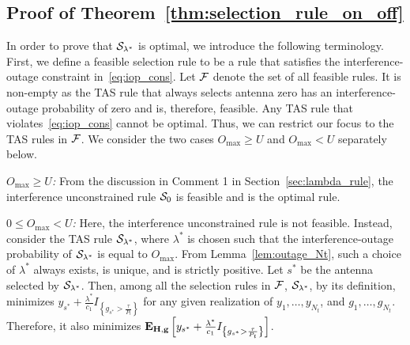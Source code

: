 \documentclass[12pt,draftcls,peerreview,onecolumn]{IEEEtran}
\newcommand{\cbrac}[1]{\left\{{#1}\right\}}
\newcommand{\indic}[1]{I_{\cbrac{#1}}}
\newcommand{\mtx}[1]{{\bf #1}} %
\newcommand{\explow}[2]{{\bf{E}}_{#1}\left[{#2}\right]}
\newcommand{\lam}{\lambda}
\newcommand{\lamstar}{\lam^{*}}
\newcommand{\sstar}{s^{*}}
\newcommand{\F}{\cal{F}}
\newcommand{\Nt}{{N_t}}
\newcommand{\Pt}{{P_t}}
\newcommand{\puch}{g}
\newcommand{\gk}[1]{{\puch_{#1}}}
\newcommand{\g}{\mathbf{\puch}}
\newcommand{\outmax}{O_{\text{max}}}
\newcommand{\itau}{\tau}
\newcommand{\cone}{c_{1}}
\newcommand{\taubypt}{\frac{\itau}{\Pt}}
\newcommand{\gkgrtaubypt}[1]{{\gk{#1}}>\taubypt}
\newcommand{\gindic}[1]{\indic{\gkgrtaubypt{#1}}}
\newcommand{\yk}[1]{y_{#1}}
\newcommand{\un}{U}
\newcommand{\Hmx}{\mtx{H}}
\newcommand{\caluncons}{{\cal S_{\text{0}}}}
\newcommand{\callamstarrule}{\cal S_{\lam^{*}}}
\begin{document}
		

\subsection{Proof of Theorem~\ref{thm:selection_rule_on_off}}
\label{proof:selection_rule_on_off}
In order to prove that $\callamstarrule$ is optimal, we introduce the following terminology. First, we define a feasible selection rule to be a rule that satisfies the interference-outage constraint in~\eqref{eq:iop_cons}. Let $\F$ denote the set of all feasible rules. It is non-empty as the TAS rule that always selects antenna zero has an interference-outage probability of zero and is, therefore, feasible. Any TAS rule that violates~\eqref{eq:iop_cons} cannot be optimal. Thus, we can restrict our focus to the TAS rules in $\F$. We consider the two cases $\outmax\geq\un$ and $\outmax<\un$ separately below.

{\em $\outmax\geq\un$:} From the discussion in Comment 1 in Section~\ref{sec:lambda_rule}, the interference unconstrained rule $\caluncons$ is feasible and is the optimal rule. 

{\em $0\leq\outmax<\un$:} Here, the interference unconstrained rule is not feasible.  Instead, consider the TAS rule $\callamstarrule$, where $\lamstar$ is chosen such that the interference-outage probability of $\callamstarrule$ is equal to $\outmax$. From Lemma~\ref{lem:outage_Nt}, such a choice of $\lamstar$ always exists, is unique, and is strictly positive. Let $\sstar$ be the antenna selected by $\callamstarrule$. Then, among all the selection rules in $\F$, $\callamstarrule$, by its definition,  minimizes $\yk{{\sstar}} + \frac{\lamstar}{\cone}\gindic{{\sstar}}$ for any given realization of $\yk{1},\ldots,\yk{\Nt}$, and $\gk{1},\ldots,\gk{\Nt}$. Therefore, it also minimizes $\explow{\Hmx,\g}{\yk{{\sstar}} + \frac{\lamstar}{\cone}\gindic{{\sstar}}}$. 
\end{document}
